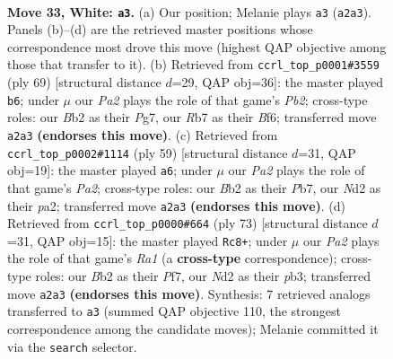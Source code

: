 \documentclass[11pt]{article}
\begin{document}
\clearpage

\begin{figure}[p]\centering
\begin{subfigure}{0.46\textwidth}\centering
\resizebox{\linewidth}{!}{%
\newchessgame
\chessboard[
  setfen={5k2/1R3p2/2p3p1/2r4p/r6P/6P1/PB1N3K/8 w - - 2 33},
  showmover=false,
  pgfstyle=straightmove, color=movearrow, markmove={a2-a3}
]}
\caption{}
\end{subfigure}\hfill
\begin{subfigure}{0.46\textwidth}\centering
\resizebox{\linewidth}{!}{%
\newchessgame
\chessboard[
  setfen={8/kp3pp1/3p1b2/1R3P2/8/P4B2/KPP5/4r3 b - - 2 35},
  showmover=false,
  pgfstyle=straightmove, color=movearrow, markmove={b7-b6}
]}
\caption{}
\end{subfigure}
\\[4pt]
\begin{subfigure}{0.46\textwidth}\centering
\resizebox{\linewidth}{!}{%
\newchessgame
\chessboard[
  setfen={7r/pp2k3/2r5/2p5/R6p/2P5/PP5P/1K1R4 b - - 2 30},
  showmover=false,
  pgfstyle=straightmove, color=movearrow, markmove={a7-a6}
]}
\caption{}
\end{subfigure}\hfill
\begin{subfigure}{0.46\textwidth}\centering
\resizebox{\linewidth}{!}{%
\newchessgame
\chessboard[
  setfen={r7/3r1p1k/6p1/7p/R6P/1PK2P2/p5P1/R7 b - - 1 37},
  showmover=false,
  pgfstyle=straightmove, color=movearrow, markmove={a8-c8}
]}
\caption{}
\end{subfigure}
\caption{\textbf{Move 33, White: \texttt{a3}.} (a) Our position; Melanie plays \texttt{a3} (\texttt{a2a3}). Panels (b)--(d) are the retrieved master positions whose correspondence most drove this move (highest QAP objective among those that transfer to it). (b) Retrieved from \texttt{ccrl\_top\_p0001\#3559} (ply 69) [structural distance $d$=29, QAP obj=36]: the master played \texttt{b6}; under $\mu$ our \emph{Pa2} plays the role of that game's \emph{Pb2}; cross-type roles: our \emph{B}b2 as their \emph{P}g7, our \emph{R}b7 as their \emph{B}f6; transferred move \texttt{a2a3} \textbf{(endorses this move)}. (c) Retrieved from \texttt{ccrl\_top\_p0002\#1114} (ply 59) [structural distance $d$=31, QAP obj=19]: the master played \texttt{a6}; under $\mu$ our \emph{Pa2} plays the role of that game's \emph{Pa2}; cross-type roles: our \emph{B}b2 as their \emph{P}b7, our \emph{N}d2 as their \emph{p}a2; transferred move \texttt{a2a3} \textbf{(endorses this move)}. (d) Retrieved from \texttt{ccrl\_top\_p0000\#664} (ply 73) [structural distance $d$=31, QAP obj=15]: the master played \texttt{Rc8+}; under $\mu$ our \emph{Pa2} plays the role of that game's \emph{Ra1} (a \textbf{cross-type} correspondence); cross-type roles: our \emph{B}b2 as their \emph{P}f7, our \emph{N}d2 as their \emph{p}b3; transferred move \texttt{a2a3} \textbf{(endorses this move)}. Synthesis: 7 retrieved analogs transferred to \texttt{a3} (summed QAP objective 110, the strongest correspondence among the candidate moves); Melanie committed it via the \texttt{search} selector.}
\label{fig:thought-m64}
\end{figure}
\end{document}
